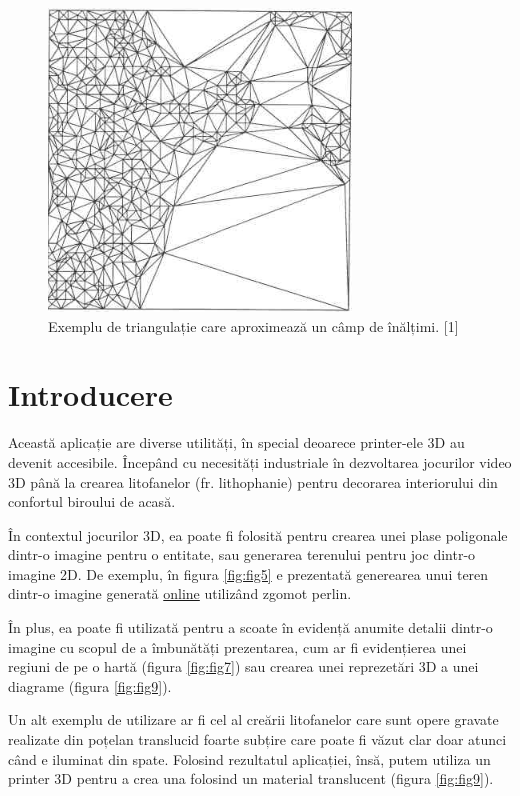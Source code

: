 \documentclass[12pt]{article}
\begin{document}
\begin{figure}[!htb]
	\begin{minipage}{0.32\textwidth}
		\centering
		\includegraphics[width=.7\linewidth]{ExempluTriangulatieCuAproximari.png}
		\caption{Exemplu de triangulație care aproximează un câmp de înălțimi. [1]}\label{fig:fig3}
	\end{minipage}
\end{figure}

\section{Introducere}

Această aplicație are diverse utilități, în special deoarece printer-ele 3D au devenit accesibile. Începând cu necesități industriale în dezvoltarea jocurilor video 3D până la crearea litofanelor (fr. lithophanie) pentru decorarea interiorului din confortul biroului de acasă.

În contextul jocurilor 3D, ea poate fi folosită pentru crearea unei plase poligonale dintr-o imagine pentru o entitate, sau generarea terenului pentru joc dintr-o imagine 2D. De exemplu, în figura \ref{fig:fig5} e prezentată generearea unui teren dintr-o imagine generată \href{https://cpetry.github.io/TextureGenerator-Online/}{online} utilizând zgomot perlin.

În plus, ea poate fi utilizată pentru a scoate în evidență anumite detalii dintr-o imagine cu scopul de a îmbunătăți prezentarea, cum ar fi evidențierea unei regiuni de pe o hartă (figura \ref{fig:fig7}) sau crearea unei reprezetări 3D a unei diagrame (figura \ref{fig:fig9}).

Un alt exemplu de utilizare ar fi cel al creării litofanelor care sunt opere gravate realizate din poțelan translucid foarte subțire care poate fi văzut clar doar atunci când e iluminat din spate. Folosind rezultatul aplicației, însă, putem utiliza un printer 3D pentru a crea una folosind un material translucent (figura \ref{fig:fig9}).
\end{document}
